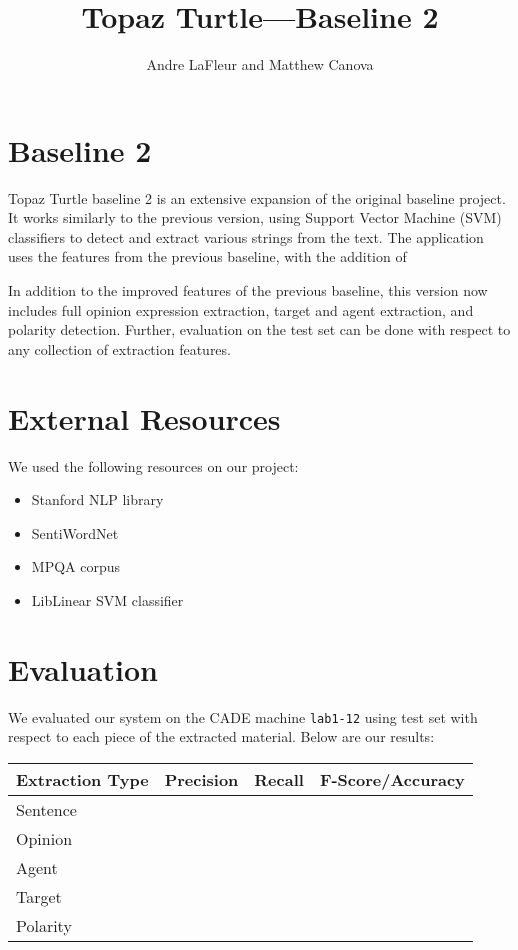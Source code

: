 \documentclass{article}
\title{Topaz Turtle---Baseline 2}
\author{Andre LaFleur and Matthew Canova}
\begin{document}
    \maketitle

    \section{Baseline 2}

    Topaz Turtle baseline 2 is an extensive expansion of the original baseline project. It works similarly to the previous version, using Support Vector Machine (SVM) classifiers to detect and extract various strings from the text. The application uses the features from the previous baseline, with the addition of %

    In addition to the improved features of the previous baseline, this version now includes full opinion expression extraction, target and agent extraction, and polarity detection. Further, evaluation on the test set can be done with respect to any collection of extraction features.

    \section{External Resources}

        We used the following resources on our project:

        \begin{itemize}
            \item Stanford NLP library
            \item SentiWordNet
            \item MPQA corpus
            \item LibLinear SVM classifier
        \end{itemize}

    \section{Evaluation}

        We evaluated our system on the CADE machine \verb|lab1-12| using test set with respect to each piece of the extracted material. Below are our results:

    \begin{center} %
        \begin{tabular}{ | l | c | r | c}
            \hline
            Extraction Type & Precision & Recall & F-Score/Accuracy \\ \hline
            Sentence &  &  & \\ \hline
            Opinion &  &  & \\ \hline
            Agent &  &  & \\ \hline
            Target &  &  & \\ \hline
            Polarity &  &  & \\ \hline
        \end{tabular}
    \end{center}
\end{document}
